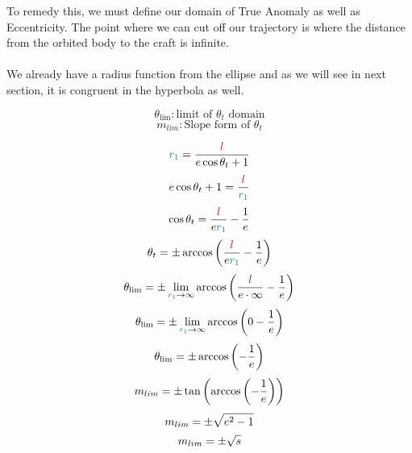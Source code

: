 To remedy this, we must define our domain of True Anomaly as well as Eccentricity. The point where we can cut off our trajectory is where the distance from the orbited body to the craft is infinite.\\\\

We already have a radius function from the ellipse and as we will see in next section, it is congruent in the hyperbola as well.

\bigskip
$$\theta_\text{lim} : \text{limit of }\theta_t \text{ domain}$$
$$m_{lim} : \text{Slope form of }\theta_t$$

\bigskip
\begin{multicols}{2}
\raggedcolumns
\noindent
$$\textcolor{teal}{r_1} = \frac{\textcolor{purple}{l}}{\textcolor{black}{e}\cos{\textcolor{black}{\theta_t}} + 1}$$
$$\textcolor{black}{e}\cos{\textcolor{black}{\theta_t}} + 1 = \frac{\textcolor{purple}{l}}{\textcolor{teal}{r_1}}$$
$$\cos{\textcolor{black}{\theta_t}} = \frac{\textcolor{purple}{l}}{\textcolor{black}{e}\textcolor{teal}{r_1}} - \frac{1}{\textcolor{black}{e}}$$
$$\textcolor{black}{\theta_t} = \pm\arccos{\left( \frac{\textcolor{purple}{l}}{\textcolor{black}{e}\textcolor{teal}{r_1}} - \frac{1}{\textcolor{black}{e}}\right)}$$
$$\theta_\text{lim} = \pm\lim_{\textcolor{teal}{r_1}\to\infty }
\arccos{\left( \frac{\textcolor{purple}{l}}{\textcolor{black}{e}\cdot\infty} - \frac{1}{\textcolor{black}{e}}\right)}$$
$$\theta_\text{lim} = \pm\lim_{\textcolor{teal}{r_1}\to\infty } \arccos{\left(0 - \frac{1}{\textcolor{black}{e}}\right)}$$
$$\theta_\text{lim} = \pm \arccos{\left(-\frac{1}{\textcolor{black}{e}}\right)}$$
$$m_{lim} = \pm \tan{\left(\arccos{\left(-\frac{1}{\textcolor{black}{e}}\right)}\right)}$$
$$m_{lim} = \pm \sqrt{\textcolor{black}{e}^2-1}$$
$$m_{lim} = \pm \sqrt{\textcolor{black}{s}}$$


\end{multicols}